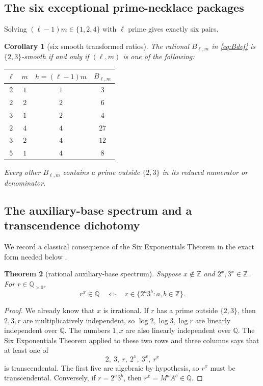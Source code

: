 \documentclass[11pt]{article}
\numberwithin{equation}{section}
\newtheorem{theorem}{Theorem}[section]
\newtheorem{corollary}[theorem]{Corollary}
\theoremstyle{definition}
\theoremstyle{remark}
\newcommand{\Q}{\mathbb Q}
\newcommand{\Z}{\mathbb Z}
\newcommand{\QQbar}{\overline{\mathbb Q}}
\begin{document}
\subsection{The six exceptional prime-necklace packages}

Solving $(\ell-1)m\in\{1,2,4\}$ with $\ell$ prime gives exactly six pairs.

\begin{corollary}[six smooth transformed ratios]\label{cor:sixpackages}
The rational $B_{\ell,m}$ in \eqref{eq:Bdef} is $\{2,3\}$-smooth if and only if $(\ell,m)$ is one of the following:
\begin{center}
\begin{tabular}{c c c c}
\toprule
$\ell$ & $m$ & $h=(\ell-1)m$ & $B_{\ell,m}$\\
\midrule
$2$ & $1$ & $1$ & $3$\\
$2$ & $2$ & $2$ & $6$\\
$3$ & $1$ & $2$ & $4$\\
$2$ & $4$ & $4$ & $27$\\
$3$ & $2$ & $4$ & $12$\\
$5$ & $1$ & $4$ & $8$\\
\bottomrule
\end{tabular}
\end{center}
Every other $B_{\ell,m}$ contains a prime outside $\{2,3\}$ in its reduced numerator or denominator.
\end{corollary}

\subsection{The auxiliary-base spectrum and a transcendence dichotomy}

We record a classical consequence of the Six Exponentials Theorem in the exact form needed below \cite{Baker,Waldschmidt}.

\begin{theorem}[rational auxiliary-base spectrum]\label{thm:spectrum}
Suppose $x\notin\Z$ and $2^x,3^x\in\Z$.  For $r\in\Q_{>0}$,
\begin{equation}\label{eq:spectrum}
  r^x\in\QQbar
  \quad\Longleftrightarrow\quad
  r\in\{2^a3^b:a,b\in\Z\}.
\end{equation}
\end{theorem}

\begin{proof}
We already know that $x$ is irrational.  If $r$ has a prime outside $\{2,3\}$, then $2,3,r$ are multiplicatively independent, so $\log2,\log3,\log r$ are linearly independent over $\Q$.  The numbers $1,x$ are also linearly independent over $\Q$.  The Six Exponentials Theorem applied to these two rows and three columns says that at least one of
\[
  2,\ 3,\ r,\ 2^x,\ 3^x,\ r^x
\]
is transcendental.  The first five are algebraic by hypothesis, so $r^x$ must be transcendental.  Conversely, if $r=2^a3^b$, then $r^x=M^aA^b\in\Q$.
\end{proof}
\end{document}

